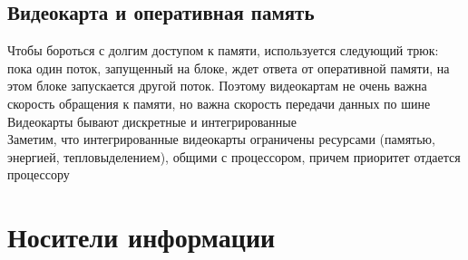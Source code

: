 \documentclass[12pt]{article}
\begin{document}
\subsection{Видеокарта и оперативная память}
Чтобы бороться с долгим доступом к памяти, используется следующий трюк: пока один поток, запущенный на блоке, ждет ответа от оперативной памяти, на этом блоке запускается другой поток. Поэтому видеокартам не очень важна скорость обращения к памяти, но важна скорость передачи данных по шине\\
Видеокарты бывают дискретные и интегрированные\\
Заметим, что интегрированные видеокарты ограничены ресурсами (памятью, энергией, тепловыделением), общими с процессором, причем приоритет отдается процессору\\
\section{Носители информации}
\end{document}
